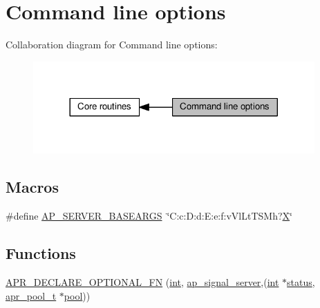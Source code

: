 \hypertarget{group__APACHE__CORE__MAIN}{}\section{Command line options}
\label{group__APACHE__CORE__MAIN}
Collaboration diagram for Command line options\+:
\nopagebreak
\begin{figure}[H]
\begin{center}
\leavevmode
\includegraphics[width=305pt]{group__APACHE__CORE__MAIN}
\end{center}
\end{figure}
\subsection*{Macros}
\begin{DoxyCompactItemize}
\item 
\#define \hyperlink{group__APACHE__CORE__MAIN_gae239400e72c98b1b05b6c656d36ee03c}{A\+P\+\_\+\+S\+E\+R\+V\+E\+R\+\_\+\+B\+A\+S\+E\+A\+R\+GS}~\char`\"{}C\+:c\+:\+D\+:d\+:\+E\+:e\+:f\+:v\+Vl\+Lt\+T\+S\+Mh?\hyperlink{mod__imagemap_8c_a207fd5507206d307cd63f95374fcd00d}{X}\char`\"{}
\end{DoxyCompactItemize}
\subsection*{Functions}
\begin{DoxyCompactItemize}
\item 
\hyperlink{group__APACHE__CORE__MAIN_ga0d96f6b0ea154bab9fa7ad2b98298069}{A\+P\+R\+\_\+\+D\+E\+C\+L\+A\+R\+E\+\_\+\+O\+P\+T\+I\+O\+N\+A\+L\+\_\+\+FN} (\hyperlink{pcre_8txt_a42dfa4ff673c82d8efe7144098fbc198}{int}, \hyperlink{group__APACHE__MPM_ga7d5ef13c9a1669642b422bcac870aac3}{ap\+\_\+signal\+\_\+server},(\hyperlink{pcre_8txt_a42dfa4ff673c82d8efe7144098fbc198}{int} $\ast$\hyperlink{group__apr__thread__proc_gae7daf19056dc6ab36e8f2e72e911646d}{status}, \hyperlink{structapr__pool__t}{apr\+\_\+pool\+\_\+t} $\ast$\hyperlink{group__APR__XLATE_gabb3cd978f04c73d0b763c391e9bfde73}{pool}))
\end{DoxyCompactItemize}
